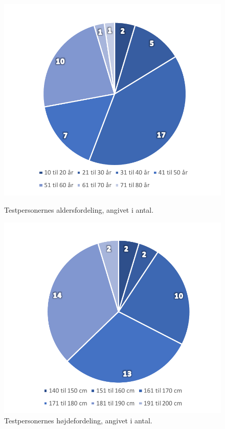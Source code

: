 \begin{figure}[H]
\centering
\begin{minipage}{.5\textwidth}
  \centering
  \includegraphics[width=\linewidth]{Figure/DatabehandlingSkalaer/DataPresentation/CirkelDiagramAlder}
  \caption{Testpersonernes aldersfordeling, angivet i antal.}
  \label{fig:CirkelDiagramAlder}
\end{minipage}%
\begin{minipage}{.5\textwidth}
  \centering
  \includegraphics[width=\linewidth]{Figure/DatabehandlingSkalaer/DataPresentation/CirkelDiagramHoejde}
  \caption{Testpersonernes højdefordeling, angivet i antal.}
  \label{fig:CirkelDiagramHoejde}
\end{minipage}
\end{figure}
